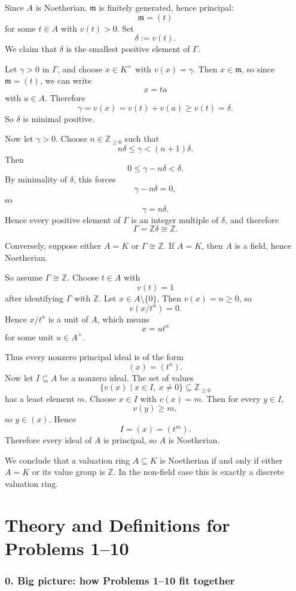 \documentclass[12pt,a4paper]{article}
\theoremstyle{notespace}
\begin{document}
Since \(A\) is Noetherian, \(\mathfrak m\) is finitely generated, hence principal:
\[
\mathfrak m=(t)
\]
for some \(t\in A\) with \(v(t)>0\). Set
\[
\delta:=v(t).
\]
We claim that \(\delta\) is the smallest positive element of \(\Gamma\).

Let \(\gamma>0\) in \(\Gamma\), and choose \(x\in K^\times\) with \(v(x)=\gamma\). Then \(x\in \mathfrak m\), so since \(\mathfrak m=(t)\), we can write
\[
x=ta
\]
with \(a\in A\). Therefore
\[
\gamma=v(x)=v(t)+v(a)\ge v(t)=\delta.
\]
So \(\delta\) is minimal positive.

Now let \(\gamma>0\). Choose \(n\in\mathbb Z_{\ge 0}\) such that
\[
n\delta\le \gamma < (n+1)\delta.
\]
Then
\[
0\le \gamma-n\delta<\delta.
\]
By minimality of \(\delta\), this forces
\[
\gamma-n\delta=0,
\]
so
\[
\gamma=n\delta.
\]
Hence every positive element of \(\Gamma\) is an integer multiple of \(\delta\), and therefore
\[
\Gamma=\mathbb Z\delta\cong \mathbb Z.
\]

Conversely, suppose either \(A=K\) or \(\Gamma\cong \mathbb Z\). If \(A=K\), then \(A\) is a field, hence Noetherian.

So assume \(\Gamma\cong \mathbb Z\). Choose \(t\in A\) with
\[
v(t)=1
\]
after identifying \(\Gamma\) with \(\mathbb Z\). Let \(x\in A\setminus\{0\}\). Then \(v(x)=n\ge 0\), so
\[
v(x/t^n)=0.
\]
Hence \(x/t^n\) is a unit of \(A\), which means
\[
x=ut^n
\]
for some unit \(u\in A^\times\).

Thus every nonzero principal ideal is of the form
\[
(x)=(t^n).
\]
Now let \(I\subseteq A\) be a nonzero ideal. The set of values
\[
\{v(x)\mid x\in I,\ x\neq 0\}\subseteq \mathbb Z_{\ge 0}
\]
has a least element \(m\). Choose \(x\in I\) with \(v(x)=m\). Then for every \(y\in I\),
\[
v(y)\ge m,
\]
so \(y\in (x)\). Hence
\[
I=(x)=(t^m).
\]
Therefore every ideal of \(A\) is principal, so \(A\) is Noetherian.

We conclude that a valuation ring \(A\subseteq K\) is Noetherian if and only if either \(A=K\) or its value group is \(\mathbb Z\). In the non-field case this is exactly a discrete valuation ring.

\part{Theory and Definitions for Problems 1--10}

\section{0. Big picture: how Problems 1--10 fit together}
\end{document}
